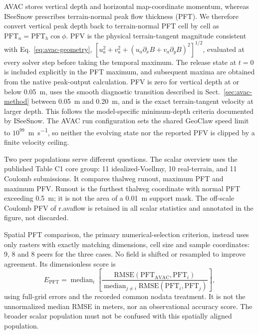 \documentclass[11pt,a4paper]{article}
\begin{document}
AVAC stores vertical depth and horizontal map-coordinate momentum, whereas
ISeeSnow prescribes terrain-normal peak flow thickness (PFT). We therefore
convert vertical peak depth back to terrain-normal PFT cell by cell as
$\mathrm{PFT}_n=\mathrm{PFT}_h\cos\phi$. PFV is the physical terrain-tangent
magnitude consistent with Eq.~\eqref{eq:avac-geometry},
$[u_a^2+v_a^2+(u_a\partial_xB+v_a\partial_yB)^2]^{1/2}$, evaluated at every
solver step before taking the temporal maximum. The release state at $t=0$ is
included explicitly in the PFT maximum, and subsequent maxima are obtained
from the native peak-output calculation. PFV is zero for vertical depth at or
below \SI{0.05}{\metre}, uses the smooth diagnostic transition described in
Sect.~\ref{sec:avac-method} between \SI{0.05}{\metre} and
\SI{0.20}{\metre}, and is the exact terrain-tangent velocity at larger depth.
This follows the model-specific minimum-depth criteria documented by
ISeeSnow. The AVAC run configuration sets the shared GeoClaw speed limit to
$10^{99}$~\si{\metre\per\second}, so neither the evolving state nor the
reported PFV is clipped by a finite velocity ceiling.

Two peer populations serve different questions. The scalar overview uses the
published Table C1 core group: 11 idealized-Voellmy, 10 real-terrain, and
11 Coulomb submissions. It compares thalweg runout, maximum PFT and maximum
PFV. Runout is the furthest thalweg coordinate with normal PFT exceeding
\SI{0.5}{\metre}; it is not the area of a \SI{0.01}{\metre} support mask.
The off-scale Coulomb PFV of r.avaflow is retained in all scalar statistics
and annotated in the figure, not discarded.

Spatial PFT comparison, the primary numerical-selection criterion, instead
uses only rasters with exactly matching dimensions, cell size and sample
coordinates: 9, 8 and 8 peers for the three cases. No field is shifted or
resampled to improve agreement. Its dimensionless score is
\begin{equation}
 E_{\mathrm{PFT}} =
 \mathop{\mathrm{median}}_i
 \left[
 \frac{\mathrm{RMSE}(\mathrm{PFT}_{\mathrm{AVAC}},\mathrm{PFT}_i)}
 {\mathop{\mathrm{median}}_{j\ne i}
  \mathrm{RMSE}(\mathrm{PFT}_i,\mathrm{PFT}_j)}
 \right],
 \label{eq:iseesnow-pft-score}
\end{equation}
using full-grid errors and the recorded common nodata treatment. It is not
the unnormalized median RMSE in meters, nor an observational accuracy score.
The broader scalar population must not be confused with this spatially
aligned population.
\end{document}
